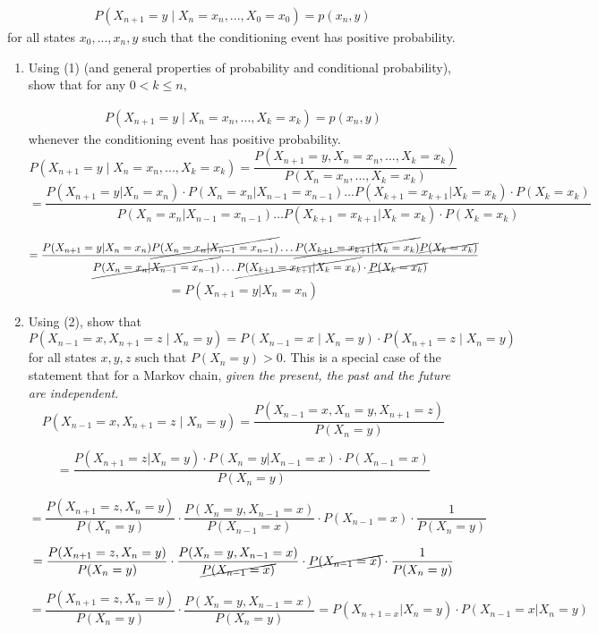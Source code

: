 \documentclass[12pt]{article}
\begin{document}
\begin{align}
P(X_{n+1} = y\;|\; X_n = x_n,...,X_0=x_0) = p(x_n,y) 
\end{align}
for all states $x_0, . . . , x_n, y$ such that the conditioning event has positive probability.
\begin{enumerate}[label=(\alph*)]
    \item Using (1) (and general properties of probability and conditional probability), show that
    for any $0 < k\le n,$
    
    \begin{align}
        P(X_{n+1} = y\;|\;X_n = x_n,...,X_k =x_k) = p(x_n,y)
    \end{align}
whenever the conditioning event has positive probability.\\

$$P(X_{n+1} = y\;|\;X_n = x_n,...,X_k =x_k)
=\frac{P(X_{n+1} = y,X_n = x_n,...,X_k =x_k)}{P(X_n = x_n,...,X_k =x_k)}$$
$$
= \frac{P(X_{n+1}=y|X_n=x_n)\cdot P(X_{n}=x_n|X_{n-1}=x_{n-1}) \ldots P(X_{k+1}=x_{k+1}|X_k = x_k)\cdot P(X_k=x_k)}
{P(X_n=x_n|X_{n-1}=x_{n-1})\ldots P(X_{k+1}=x_{k+1}|X_k = x_k)\cdot P(X_k=x_k)}
$$

$$
= \frac{P(X_{n+1}=y|X_n=x_n)\cancel{P(X_{n}=x_n|X_{n-1}=x_{n-1})} \ldots \cancel{P(X_{k+1}=x_{k+1}|X_k = x_k)} \cancel{P(X_k=x_k)}}
{\cancel{P(X_n=x_n|X_{n-1}=x_{n-1})}\ldots \cancel{P(X_{k+1}=x_{k+1}|X_k = x_k)}\cdot \cancel{P(X_k=x_k)}}
$$
$$
=P(X_{n+1}=y|X_n=x_n)
$$
\newpage
\item Using (2), show that
$$
P(X_{n-1} = x, X_{n+1} = z\;|\;X_n = y) = P(X_{n-1} = x\;|\;X_n = y) \cdot P(X_{n+1} = z\;|\;X_n = y)
$$
for all states $x, y, z$ such that $P(X_n = y) > 0$. This is a special case of the statement
that for a Markov chain, \textit{given the present, the past and the future are independent}.\\

$$
P(X_{n-1} = x, X_{n+1} = z\;|\;X_n = y) = \frac{P(X_{n-1}=x,X_n=y,X_{n+1}=z)}{P(X_n=y)}
$$

$$
=\frac{P(X_{n+1}=z|X_n=y)\cdot P(X_{n}=y|X_{n-1}=x)\cdot P(X_{n-1}=x)}{P(X_n=y)}
$$

$$
=
\frac{P(X_{n+1}=z,X_n=y)}{P(X_n=y)}\cdot 
\frac{P(X_{n}=y,X_{n-1}=x)}{P(X_{n-1}=x)}\cdot 
P(X_{n-1}=x)\cdot
\frac{1}{P(X_n=y)}
$$

$$
=
\frac{P(X_{n+1}=z,X_n=y)}{P(X_n=y)}\cdot 
\frac{P(X_{n}=y,X_{n-1}=x)}{\cancel{P(X_{n-1}=x)}}\cdot 
\cancel{P(X_{n-1}=x)}\cdot
\frac{1}{P(X_n=y)}
$$

$$
=
\frac{P(X_{n+1}=z,X_n=y)}{P(X_n=y)}\cdot 
\frac{P(X_{n}=y,X_{n-1}=x)}{P(X_n=y)}
=
P(X_{n+1=x}|X_n=y) \cdot P(X_{n-1}=x|X_n=y)
$$
\end{enumerate}
\end{document}
